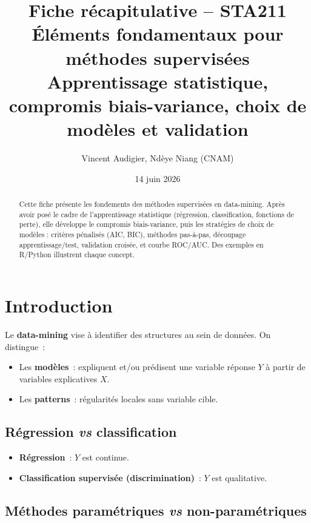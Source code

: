 \documentclass[a4paper,11pt]{article}
\title{\textbf{Fiche r\'ecapitulative -- STA211}\\[4pt]
\large \'El\'ements fondamentaux pour m\'ethodes supervis\'ees \\[2pt]
\small Apprentissage statistique, compromis biais-variance,
choix de mod\`eles et validation}
\author{Vincent Audigier, Nd\`eye Niang (CNAM)}
\date{14 juin 2026}
\theoremstyle{definition}
\theoremstyle{remark}
\begin{document}
\maketitle
\thispagestyle{empty}

\begin{abstract}
Cette fiche pr\'esente les fondements des m\'ethodes supervis\'ees
en data-mining. Apr\`es avoir pos\'e le cadre de l'apprentissage
statistique (r\'egression, classification, fonctions de perte), elle
d\'eveloppe le compromis biais-variance, puis les strat\'egies de
choix de mod\`eles : crit\`eres p\'enalis\'es (AIC, BIC), m\'ethodes
pas-\`a-pas, d\'ecoupage apprentissage/test, validation crois\'ee,
et courbe ROC/AUC. Des exemples en R/Python illustrent chaque
concept.
\end{abstract}

\vfill
\tableofcontents
\newpage

\section{Introduction}

Le \textbf{data-mining} vise \`a identifier des structures au sein
de donn\'ees. On distingue~:
\begin{itemize}
  \item Les \textbf{mod\`eles}~: expliquent et/ou pr\'edisent une
    variable r\'eponse $Y$ \`a partir de variables explicatives $X$.
  \item Les \textbf{patterns}~: r\'egularit\'es locales sans
    variable cible.
\end{itemize}

\subsection{R\'egression \emph{vs} classification}

\begin{itemize}
  \item \textbf{R\'egression}~: $Y$ est continue.
  \item \textbf{Classification supervis\'ee (discrimination)}~:
    $Y$ est qualitative.
\end{itemize}

\subsection{M\'ethodes param\'etriques \emph{vs}
  non-param\'etriques}
\end{document}
